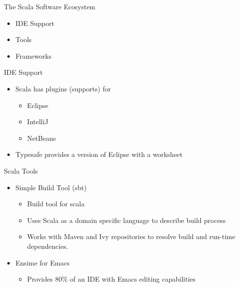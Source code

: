 \documentclass[t]{beamer}
\begin{document}

\begin{frame}{The Scala Software Ecosystem}
  \begin{itemize}
  \item IDE Support
  \item Tools
  \item Frameworks
  \end{itemize}
  \note{}
\end{frame}



\begin{frame}{IDE Support}
  \begin{itemize}
  \item Scala has plugins (supports) for
    \begin{itemize}
    \item Eclipse
    \item IntelliJ
    \item NetBeans
    \end{itemize}
  \item Typesafe provides a version of Eclipse with a worksheet
  \end{itemize}
  \note{}
\end{frame}


\begin{frame}{Scala Tools}
  \begin{itemize}
  \item Simple Build Tool (sbt)
    \begin{itemize}
    \item Build tool for scala
    \item Uses Scala as a domain specific language to describe build process
    \item Works with Maven and Ivy repositories to resolve build and
      run-time dependencies.
  \end{itemize}
  \item Ensime for Emacs
    \begin{itemize}
    \item Provides 80\% of an IDE with Emacs editing capabilities
    \end{itemize}
  \end{itemize}
  \note{}
\end{frame}
\end{document}
